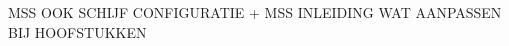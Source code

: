 \chapter{}
\label{ch:basisconf}


MSS OOK SCHIJF CONFIGURATIE + MSS INLEIDING WAT AANPASSEN BIJ HOOFSTUKKEN